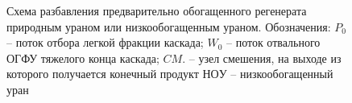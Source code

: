 \begin{figure}[ht]
  \caption{Схема разбавления предварительно обогащенного регенерата природным ураном или низкообогащенным ураном. Обозначения: $P_0$ -- поток отбора легкой фракции каскада; $W_0$ -- поток отвального ОГФУ тяжелого конца каскада; $CM.$ -- узел смешения, на выходе из которого получается конечный продукт $НОУ$ -- низкообогащенный уран}\label{o1}
\end{figure}

